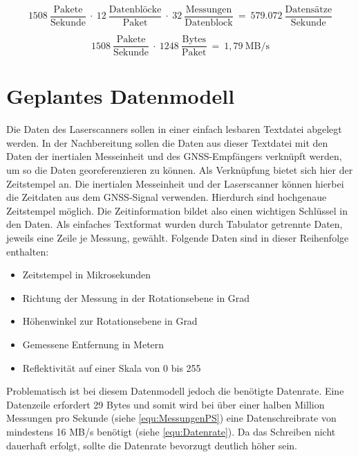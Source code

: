 \documentclass[a4paper,12pt,bibliography=totoc, listof=totoc,titlepage,pointlessnumbers]{scrreprt}
\begin{document}
\begin{equation}
1508~\frac{\text{Pakete}}{\text{Sekunde}}~\cdot~12~\frac{\text{Datenbl\"{o}cke}}{\text{Paket}}~\cdot~
32~\frac{\text{Messungen}}{\text{Datenblock}}~=~579.072~\frac{\text{Datens\"{a}tze}}{\text{Sekunde}}
 \label{equ:MessungenPS}
\end{equation}

\begin{equation}
1508~\frac{\text{Pakete}}{\text{Sekunde}}~\cdot~1248~\frac{\text{Bytes}}{\text{Paket}}~=~1,79~\text{MB/s}
 \label{equ:Ausgangsrate}
\end{equation}

\section{Geplantes Datenmodell}
\label{s:datenmodell}
Die Daten des Laser\-scan\-ners sollen in einer einfach lesbaren Textdatei abgelegt werden. In der Nachbereitung sollen die Daten aus dieser Textdatei mit den Daten der inertialen Messeinheit und des GNSS-Empfängers verknüpft werden, um so die Daten georeferenzieren zu können. Als Verknüpfung bietet sich hier der Zeitstempel an. Die inertialen Messeinheit und der Laser\-scan\-ner können hierbei die Zeitdaten aus dem GNSS-Signal verwenden. Hierdurch sind hochgenaue Zeitstempel möglich. Die Zeitinformation bildet also einen wichtigen Schlüssel in den Daten. Als einfaches Textformat wurden durch Tabulator getrennte Daten, jeweils eine Zeile je Messung, gewählt. Folgende Daten sind in dieser Reihenfolge enthalten:

\begin{itemize}
 \item Zeitstempel in Mikrosekunden
 \item Richtung der Messung in der Rotationsebene in Grad
 \item Höhenwinkel zur Rotationsebene in Grad
 \item Gemessene Entfernung in Metern
 \item Reflektivität auf einer Skala von 0 bis 255
\end{itemize}

Problematisch ist bei diesem Datenmodell jedoch die benötigte Datenrate. Eine Datenzeile erfordert 29 Bytes und somit wird bei über einer halben Million Messungen pro Sekunde (siehe \autoref{equ:MessungenPS}) eine Datenschreibrate von mindestens 16 MB/s benötigt (siehe \autoref{equ:Datenrate}). Da das Schreiben nicht dauerhaft erfolgt, sollte die Datenrate bevorzugt deutlich höher sein.
\end{document}
